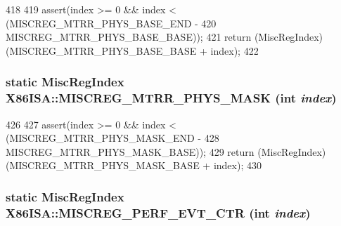 \begin{DoxyCode}
418     {
419         assert(index >= 0 && index < (MISCREG_MTRR_PHYS_BASE_END -
420                                       MISCREG_MTRR_PHYS_BASE_BASE));
421         return (MiscRegIndex)(MISCREG_MTRR_PHYS_BASE_BASE + index);
422     }
\end{DoxyCode}
\hypertarget{namespaceX86ISA_a181eaf0dd78921a606c1727c0ea17e0d}{
\subsubsection[{MISCREG\_\-MTRR\_\-PHYS\_\-MASK}]{\setlength{\rightskip}{0pt plus 5cm}static {\bf MiscRegIndex} X86ISA::MISCREG\_\-MTRR\_\-PHYS\_\-MASK (int {\em index})}}
\label{namespaceX86ISA_a181eaf0dd78921a606c1727c0ea17e0d}



\begin{DoxyCode}
426     {
427         assert(index >= 0 && index < (MISCREG_MTRR_PHYS_MASK_END -
428                                       MISCREG_MTRR_PHYS_MASK_BASE));
429         return (MiscRegIndex)(MISCREG_MTRR_PHYS_MASK_BASE + index);
430     }
\end{DoxyCode}
\hypertarget{namespaceX86ISA_adf79cb6816cce0adf35b8b7808facc44}{
\subsubsection[{MISCREG\_\-PERF\_\-EVT\_\-CTR}]{\setlength{\rightskip}{0pt plus 5cm}static {\bf MiscRegIndex} X86ISA::MISCREG\_\-PERF\_\-EVT\_\-CTR (int {\em index})}}
\label{namespaceX86ISA_adf79cb6816cce0adf35b8b7808facc44}



